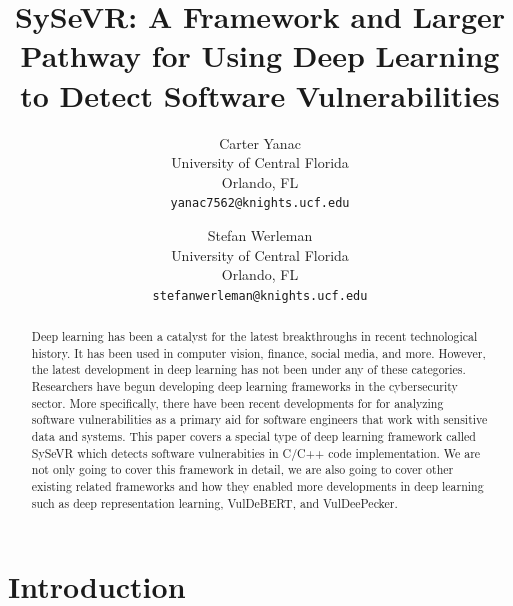 \documentclass[12pt,twocolumn,letterpaper]{article}
\begin{document}
\title{SySeVR: A Framework and Larger Pathway for Using Deep Learning to Detect Software Vulnerabilities}

\author{
    Carter Yanac\\
    University of Central Florida\\
    Orlando, FL\\
    {\tt\small yanac7562@knights.ucf.edu}
    \and
    Stefan Werleman\\
    University of Central Florida\\
    Orlando, FL\\
    {\tt\small stefanwerleman@knights.ucf.edu}
}
\maketitle

\begin{abstract}
    Deep learning has been a catalyst for the latest breakthroughs in recent technological history. It has been 
    used in computer vision, finance, social media, and more. However, the latest development in deep 
    learning has not been under any of these categories. Researchers have begun developing deep learning 
    frameworks in the cybersecurity sector. More specifically, there have been recent developments for 
    for analyzing software vulnerabilities as a primary aid for software engineers that work with sensitive 
    data and systems. This paper covers a special type of deep learning framework called SySeVR which 
    detects software vulnerabities in C/C++ code implementation. We are not only going to cover this framework in detail,
    we are also going to cover other existing related frameworks and how they enabled more 
    developments in deep learning such as deep representation learning, VulDeBERT, and VulDeePecker.
\end{abstract}

\section{Introduction}
\label{sec:intro}
\end{document}
